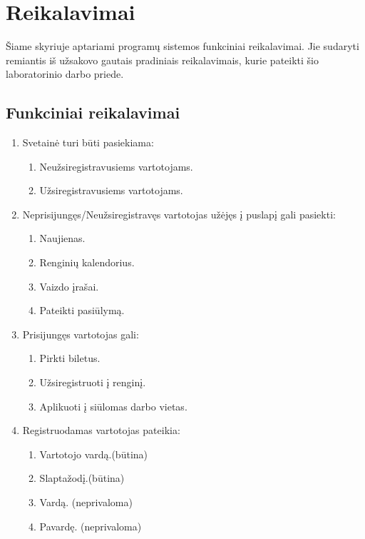 \documentclass{VUMIFPSkursinis}
\begin{document}
    \section{Reikalavimai} \label{reikalavimai}
		Šiame skyriuje aptariami programų sistemos funkciniai reikalavimai. Jie sudaryti remiantis iš užsakovo gautais pradiniais reikalavimais, kurie pateikti šio laboratorinio darbo priede.
        \subsection{Funkciniai reikalavimai} \label{reikalavimai_fr}
			\begin{enumerate}[label=\textbf{FR\arabic*}]
				\item Svetainė turi būti pasiekiama:
					\begin{enumerate}[label*=\textbf{.\arabic*}]
						\item Neužsiregistravusiems vartotojams.
						\item Užsiregistravusiems vartotojams.
					\end{enumerate}
				\item Neprisijungęs/Neužsiregistravęs vartotojas užėjęs į puslapį gali pasiekti:
					\begin{enumerate}[label*=\textbf{.\arabic*}]
						\item Naujienas.
						\item Renginių kalendorius.
						\item Vaizdo įrašai.
						\item Pateikti pasiūlymą.
					\end{enumerate}	
				\item Prisijungęs vartotojas gali:
					\begin{enumerate}[label*=\textbf{.\arabic*}]
						\item Pirkti biletus.
						\item Užsiregistruoti į renginį.
						\item Aplikuoti į siūlomas darbo vietas.
					\end{enumerate}
				\item Registruodamas vartotojas pateikia:
					\begin{enumerate}[label*=\textbf{.\arabic*}]
						\item Vartotojo vardą.(būtina)
						\item Slaptažodį.(būtina)
						\item Vardą. (neprivaloma)
						\item Pavardę. (neprivaloma)

\end{enumerate}
\end{enumerate}
\end{document}
